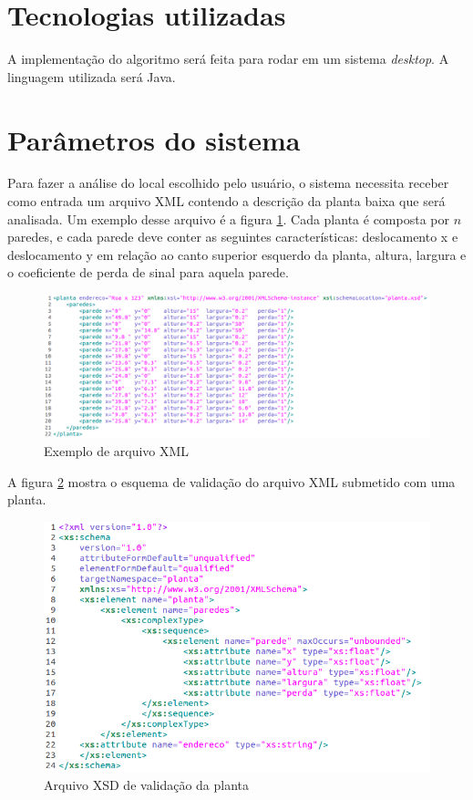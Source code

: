 \documentclass[tc,twoside]{iiufrgs}
\begin{document}
\section{Tecnologias utilizadas}

A implementação do algoritmo será feita para rodar em um sistema \textit{desktop}. A linguagem utilizada será Java.

\section{Parâmetros do sistema}

Para fazer a análise do local escolhido pelo usuário, o sistema necessita receber como entrada um arquivo XML contendo a descrição da planta baixa que será analisada. Um exemplo desse arquivo é a figura \ref{fig:exemploXml}. Cada planta é composta por $n$ paredes, e cada parede deve conter as seguintes características: deslocamento x e deslocamento y em relação ao canto superior esquerdo da planta, altura, largura e o coeficiente de perda de sinal para aquela parede. 

\begin{figure}[h]
	\centering
	\includegraphics[scale=0.4]{img/exXml.png}
	\caption{Exemplo de arquivo XML}
	\label{fig:exemploXml}
\end{figure}

A figura \ref{fig:exemploXsd} mostra o esquema de validação do arquivo XML submetido com uma planta. 

\begin{figure}[h]
	\centering
	\includegraphics[scale=0.5]{img/exXsd.png}
	\caption{Arquivo XSD de validação da planta}
	\label{fig:exemploXsd}
\end{figure}
\end{document}
